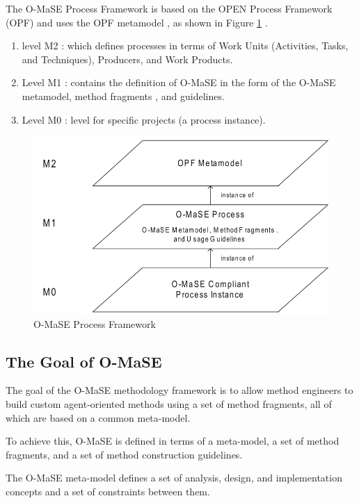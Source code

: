 The O-MaSE Process Framework is based on the OPEN Process Framework (OPF)
 and uses the OPF metamodel  , as shown in Figure \ref{fig:O-MaSE Process Framework}  .\cite{omacs4}

\begin{enumerate}
\item 
	level M2 : which defines processes in terms of Work Units (Activities, Tasks, and Techniques),
	 Producers, and Work Products.
\item
	Level M1 : contains the definition of O-MaSE in the form of the O-MaSE metamodel, method fragments
	, and guidelines. 
\item
	Level M0  : level for specific projects (a process instance).
\end{enumerate} 

\begin{figure}[th]
	\centering %
		\includegraphics[scale=0.4]{chapiter1/img/omase.pdf}
	\caption{\label{fig:O-MaSE Process Framework}O-MaSE Process Framework \cite{omacs4} }
\end{figure}
\subsection{ The Goal of O-MaSE }

The goal of the O-MaSE methodology framework is to allow method engineers to
build custom agent-oriented methods using a set of method fragments, all of which are
based on a common meta-model. \cite{omacs7}

To achieve this, O-MaSE is defined in terms of a meta-model, a set of method fragments, and a set of method construction guidelines. 

The O-MaSE meta-model defines a set of analysis, design, and implementation concepts and a
set of constraints between them. 

